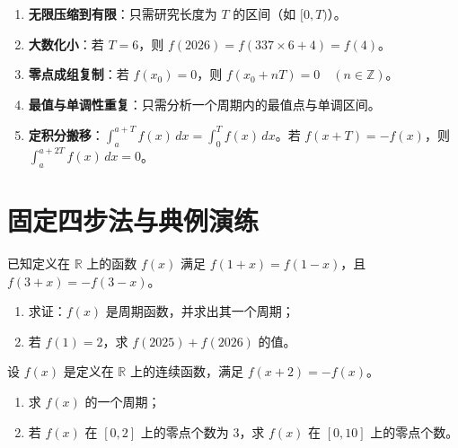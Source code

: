 \documentclass[11pt,a4paper]{ctexart}
\begin{document}
\begin{enumerate}[label=\arabic*. , leftmargin=2em, itemsep=0.4em]
  \item \textbf{无限压缩到有限}：只需研究长度为 $T$ 的区间（如 $[0,T)$）。
  \item \textbf{大数化小}：若 $T=6$，则 $f(2026) = f(337 \times 6 + 4) = f(4)$。
  \item \textbf{零点成组复制}：若 $f(x_0)=0$，则 $f(x_0+nT)=0 \quad (n \in \mathbb{Z})$。
  \item \textbf{最值与单调性重复}：只需分析一个周期内的最值点与单调区间。
  \item \textbf{定积分搬移}：$\int_{a}^{a+T} f(x) \, dx = \int_{0}^{T} f(x) \, dx$。若 $f(x+T) = -f(x)$，则 $\int_{a}^{a+2T} f(x) \, dx = 0$。
\end{enumerate}

\newpage

\section{固定四步法与典例演练}


已知定义在 $\mathbb{R}$ 上的函数 $f(x)$ 满足 $f(1+x) = f(1-x)$，且 $f(3+x) = -f(3-x)$。
\begin{enumerate}[label=(\arabic*)]
  \item 求证：$f(x)$ 是周期函数，并求出其一个周期；
  \item 若 $f(1) = 2$，求 $f(2025) + f(2026)$ 的值。
\end{enumerate}



设 $f(x)$ 是定义在 $\mathbb{R}$ 上的连续函数，满足 $f(x+2) = -f(x)$。
\begin{enumerate}[label=(\arabic*)]
  \item 求 $f(x)$ 的一个周期；
  \item 若 $f(x)$ 在 $[0,2]$ 上的零点个数为 $3$，求 $f(x)$ 在 $[0,10]$ 上的零点个数。
\end{enumerate}
\end{document}
